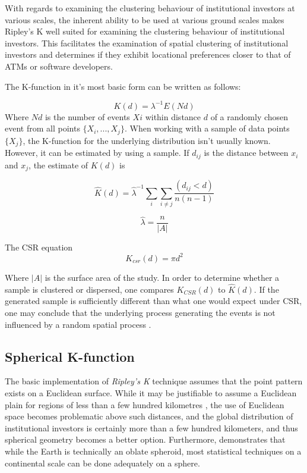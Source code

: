 With regards to examining the clustering behaviour of institutional investors at various scales, the inherent ability to be used at various ground scales makes Ripley's K well suited for examining the clustering behaviour of institutional investors.  This facilitates the examination  of spatial clustering of institutional investors  and determines if they exhibit locational preferences closer to that of ATMs or software developers. 

The K-function in it's most basic form can be written as follows:  

\begin{equation}
K(d) = \lambda^{-1}E(Nd)
\end{equation}
Where $Nd$ is the number of events $Xi$ within distance $d$ of a randomly chosen event from all points $\{X_{i},...,X_{j} \}$.  When working with a sample of data points $\{ X_{j} \}$, the K-function for the underlying distribution isn't usually known.  However, it can be estimated by using a sample.  If $d_{ij}$ is the distance between $x_{i}$ and $x_{j}$, the estimate of $K(d)$ is 

\begin{equation}
\hat{K}(d) = \hat{\lambda}^{-1}\sum_{i}\sum_{i \neq j}\dfrac{(d_{ij} < d)}{n(n-1)}
\end{equation}

\begin{equation}
    \hat{\lambda} = \dfrac{n}{|A|}
\end{equation}

The CSR equation
\begin{equation}
    K_{csr}(d) = \pi d^{2}
    \label{eq:csr}
\end{equation}

Where $|A|$ is the surface area of the study.  In order to determine whether a sample is clustered or dispersed, one compares $K_{CSR}(d)$ to $\hat{K}(d)$.  If the generated sample is sufficiently different than what one would expect under CSR, one may conclude that the underlying process generating the events is not influenced by a random spatial process \citep{brunsdon2015introduction}. 

\subsection{Spherical K-function}

The basic implementation of \textit{Ripley's K} technique assumes that the point pattern exists on a Euclidean surface.  While it may be justifiable to assume a Euclidean plain for regions of less than a few hundred kilometres \citep{HeatherJ.Lynch2008,wilschut2015spatial},  the use of Euclidean space becomes problematic above such distances, and the global distribution of institutional investors is certainly more than a few hundred kilometers, and thus spherical geometry becomes a better option. Furthermore, \cite{Tobler2002} demonstrates that while the Earth is technically an oblate spheroid, most statistical techniques on a continental scale can be done adequately on a sphere.  

